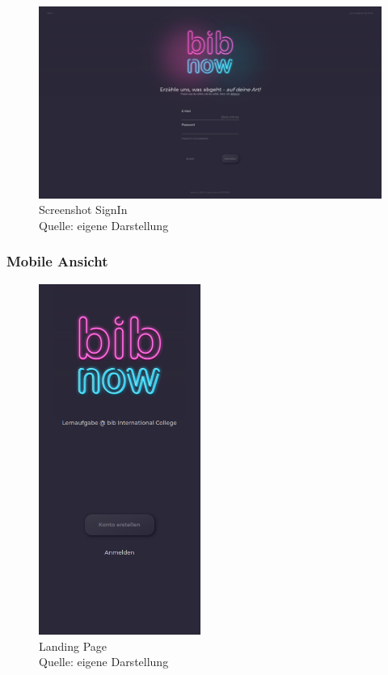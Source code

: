 \documentclass[12pt,titlepage]{article}
\begin{document}
\begin{figure}[hbt!]
\centering
\includegraphics[width=400pt]{screenshots/Screenshot_Desktop3.png}
\caption[Srenshot Sign In]{Screenshot SignIn \\Quelle: eigene Darstellung}
\end{figure}

\FloatBarrier

\subsubsection{Mobile Ansicht}

\begin{figure}[hbt!]
\centering
\includegraphics[width=150pt]{screenshots/Screenshot_Mobil1.png}
\caption[Srenshot Landing Page]{Landing Page \\Quelle: eigene Darstellung}
\end{figure}
\end{document}
